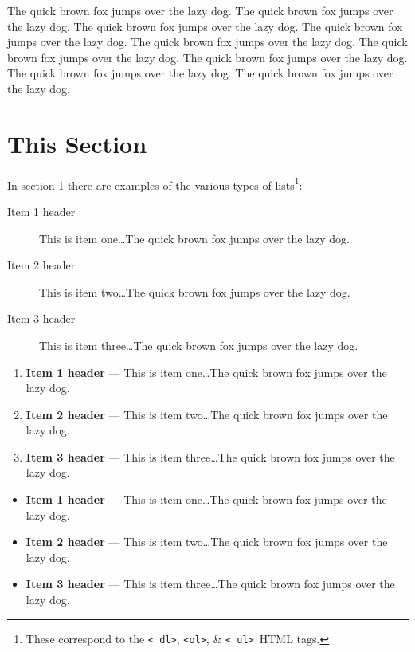 \documentclass[11pt]{article}%
\begin{document}
\begin{multicols*}{2}
The quick brown fox
jumps over the lazy
dog. The quick brown fox jumps over the lazy dog. The
quick brown fox jumps over the lazy dog. The quick brown fox jumps
over the lazy dog. The quick brown fox jumps over the lazy dog. The
quick brown fox jumps over the lazy dog. The quick brown fox jumps
over the lazy dog. The quick brown fox jumps over the lazy dog. The
quick brown fox jumps over the lazy dog.

\section{This Section}
\label{This Section}

In section \ref{This Section} there are examples of the various
types of lists\footnote{These correspond to the {\tt \textless
dl\textgreater}, {\tt \textless ol\textgreater}, \& {\tt \textless
ul\textgreater}\ HTML tags.}:

\begin{description}
\item[Item 1 header] This is item one\dots The quick brown fox jumps
over the lazy dog.
\item[Item 2 header] This is item two\dots The quick brown fox jumps
over the lazy dog.
\item[Item 3 header] This is item three\dots The quick brown fox jumps
over the lazy dog.
\end{description}

\begin{enumerate}
\item {\bf Item 1 header} --- This is item one\dots The quick brown fox jumps
over the lazy dog.
\item {\bf Item 2 header} --- This is item two\dots The quick brown fox jumps
over the lazy dog.
\item {\bf Item 3 header} --- This is item three\dots The quick brown fox jumps
over the lazy dog.
\end{enumerate}

\begin{itemize}
\item {\bf Item 1 header} --- This is item one\dots The quick brown fox jumps
over the lazy dog.
\item {\bf Item 2 header} --- This is item two\dots The quick brown fox jumps
over the lazy dog.
\item {\bf Item 3 header} --- This is item three\dots The quick brown fox jumps
over the lazy dog.
\end{itemize}


\end{multicols*}
\end{document}

